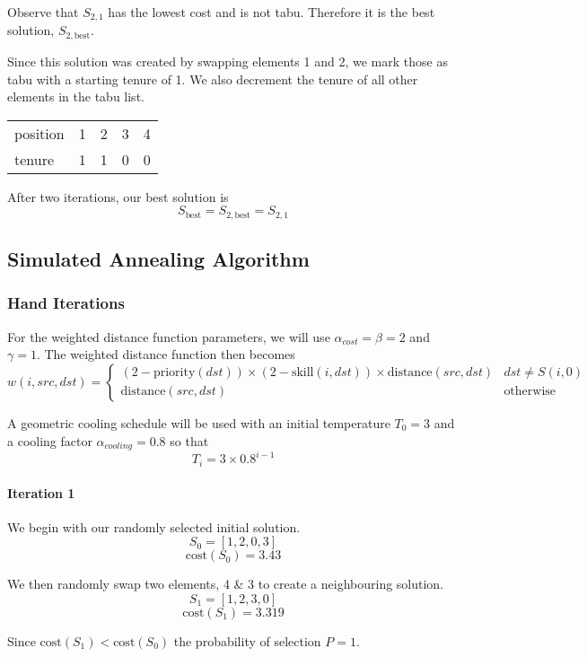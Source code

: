 \documentclass[a4paper]{article}
\newcommand{\subsubsubsection}[1]{\paragraph{#1} \mbox{}}
\begin{document}
Observe that $S_{2,1}$ has the lowest cost and is not tabu. Therefore it is the best solution, $S_{2, \text{best}}$.

Since this solution was created by swapping elements 1 and 2, we mark those as tabu with a starting tenure of 1. We also decrement the tenure of all other elements in the tabu list.

\begin{tabular}{lllll}
position & 1 & 2 & 3 & 4 \\
tenure   & 1 & 1 & 0 & 0
\end{tabular}
\vspace{1.5em}

After two iterations, our best solution is
$$S_{\text{best}} = S_{2, \text{best}} = S_{2,1}$$

\subsection{Simulated Annealing Algorithm} %

\subsubsection{Hand Iterations}

For the weighted distance function parameters, we will use $\alpha_{cost} = \beta = 2$ and $\gamma = 1$. The weighted distance function then becomes
$$
w(i, \mathit{src}, \mathit{dst}) = \begin{cases}
(2 - \text{priority}(\mathit{dst})) \times (2 - \text{skill}(i, \mathit{dst})) \times \text{distance}(\mathit{src}, \mathit{dst}) & \mathit{dst} \ne S(i,0) \\
\text{distance}(\mathit{src}, \mathit{dst}) & \text{otherwise}
\end{cases}
$$

A geometric cooling schedule will be used with an initial temperature $T_{0} = 3$ and a cooling factor $\alpha_{cooling} = 0.8$ so that
$$T_{i} = 3 \times 0.8^{i-1}$$

\subsubsubsection{Iteration 1}

We begin with our randomly selected initial solution.
$$S_0 = [ 1, 2, 0, 3 ]$$
$$\text{cost}(S_0) = 3.43$$

We then randomly swap two elements, 4 \& 3 to create a neighbouring solution.
$$S_1 = [ 1, 2, 3, 0 ]$$
$$\text{cost}(S_1) = 3.319$$

Since $\text{cost}(S_1) < \text{cost}(S_0)$ the probability of selection $P = 1$.
\end{document}
